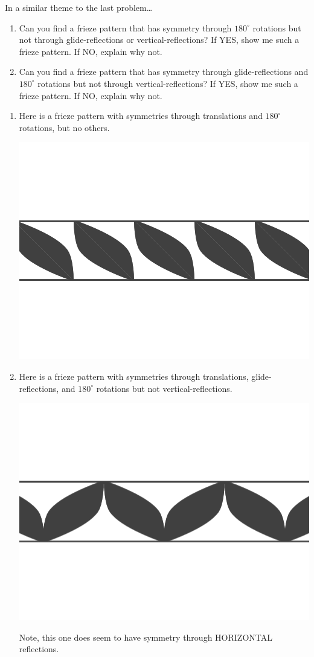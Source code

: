 \documentclass[noauthor,nooutcomes,hints,handout]{../ximera}
\begin{document}
\begin{question}
  In a similar theme to the last problem\dots 
  \begin{enumerate}
    \item Can you find a frieze pattern that has symmetry through
      $180^\circ$ rotations but not through glide-reflections or
      vertical-reflections? If YES, show me such a frieze pattern. If
      NO, explain why not.
  
    \item Can you find a frieze pattern that has symmetry through
      glide-reflections and $180^\circ$ rotations but not through
      vertical-reflections? If YES, show me such a frieze pattern. If
      NO, explain why not.
  \end{enumerate}
  \begin{freeResponse}
    \begin{enumerate}
    \item Here is a frieze pattern with symmetries through
      translations and $180^\circ$ rotations, but no others.
      \begin{center}
        \includegraphics[width=.6\textwidth]{ansR.png}
      \end{center}
    \item Here is a frieze pattern with symmetries through
      translations, glide-reflections, and $180^\circ$ rotations but
      not vertical-reflections.
        \begin{center}
          \includegraphics[width=.6\textwidth]{ansRGR.png}
        \end{center}
        Note, this one does seem to have symmetry through HORIZONTAL
        reflections.
    \end{enumerate}
  \end{freeResponse}
\end{question}
\end{document}
